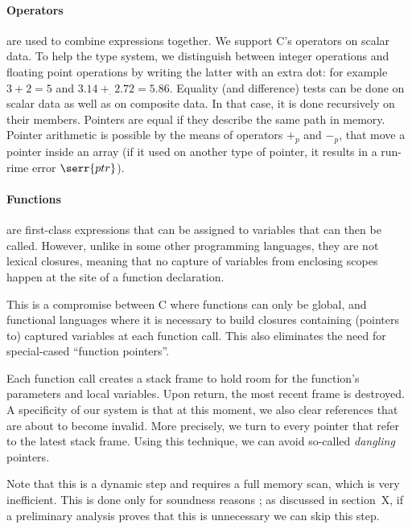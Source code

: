\paragraph{Operators} are used to combine expressions together. We support C's
operators on scalar data. To help the type system, we distinguish between
integer operations and floating point operations by writing the latter with an
extra dot: for example $3 + 2 = 5$ and $3.14~+_.~2.72 = 5.86$. Equality (and
difference) tests can be done on scalar data as well as on composite data. In
that case, it is done recursively on their members. Pointers are equal if they
describe the same path in memory. Pointer arithmetic is possible by the means of
operators $+_p$ and $-_p$, that move a pointer inside an array (if it used on
another type of pointer, it results in a run-rime error $\serr{ptr}$).

\paragraph{Functions} are first-class expressions that can be assigned to
variables that can then be called. However, unlike in some other programming
languages, they are not lexical closures, meaning that no capture of variables
from enclosing scopes happen at the site of a function declaration.

This is a compromise between C where functions can only be global, and
functional languages where it is necessary to build closures containing (pointers
to) captured variables at each function call. This also eliminates the need for
special-cased ``function pointers''.

Each function call creates a stack frame to hold room for the function's
parameters and local variables. Upon return, the most recent frame is destroyed.
A specificity of our system is that at this moment, we also clear references
that are about to become invalid. More precisely, we turn to \eNull every
pointer that refer to the latest stack frame. Using this technique, we can avoid
so-called \emph{dangling} pointers.

Note that this is a dynamic step and requires a full memory scan, which is very
inefficient. This is done only for soundness reasons ; as discussed in
section~X, if a preliminary analysis proves that this is unnecessary we can skip
this step.


